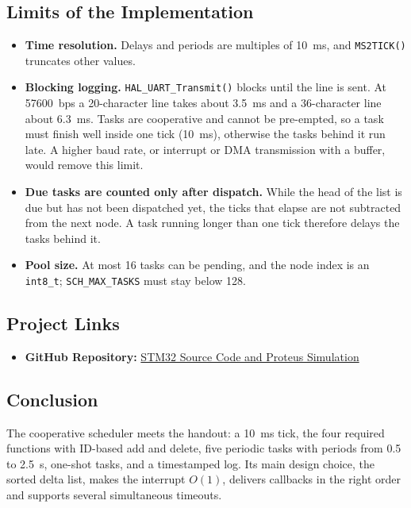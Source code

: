 \documentclass[twoside,final]{hcmut-report}
\begin{document}
\subsection{Limits of the Implementation}
\begin{itemize}
    \item \textbf{Time resolution.} Delays and periods are multiples of 10~ms, and \texttt{MS2TICK()} truncates other values.
    \item \textbf{Blocking logging.} \texttt{HAL\_UART\_Transmit()} blocks until the line is sent. At 57600~bps a 20-character line takes about 3.5~ms and a 36-character line about 6.3~ms. Tasks are cooperative and cannot be pre-empted, so a task must finish well inside one tick (10~ms), otherwise the tasks behind it run late. A higher baud rate, or interrupt or DMA transmission with a buffer, would remove this limit.
    \item \textbf{Due tasks are counted only after dispatch.} While the head of the list is due but has not been dispatched yet, the ticks that elapse are not subtracted from the next node. A task running longer than one tick therefore delays the tasks behind it.
    \item \textbf{Pool size.} At most 16 tasks can be pending, and the node index is an \texttt{int8\_t}; \texttt{SCH\_MAX\_TASKS} must stay below 128.
\end{itemize}

\subsection{Project Links}
\begin{itemize}
    \item \textbf{GitHub Repository:} \href{https://github.com/TranNgocBao1/Lab4-Microprocessors-Microcontrollers}{STM32 Source Code and Proteus Simulation}
\end{itemize}

\subsection{Conclusion}
The cooperative scheduler meets the handout: a 10~ms tick, the four required functions with ID-based add and delete, five periodic tasks with periods from 0.5 to 2.5~s, one-shot tasks, and a timestamped log. Its main design choice, the sorted delta list, makes the interrupt $O(1)$, delivers callbacks in the right order and supports several simultaneous timeouts.
\end{document}
